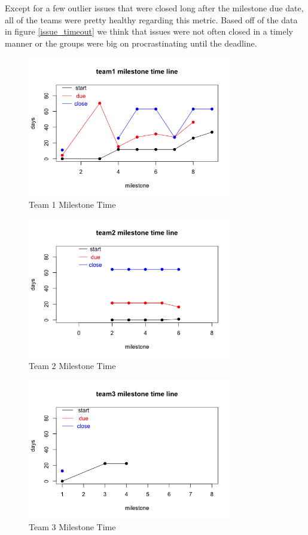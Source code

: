 \documentclass[conference]{IEEEtran}
\begin{document}
Except for a few outlier issues that were closed long after the milestone due date, all of the teams were pretty healthy regarding this metric. Based off of the data in figure \ref{issue_timeout} we think that issues were not often closed in a timely manner or the groups were big on procrastinating until the deadline. 

\begin{figure}[H]
    \centering
    \includegraphics[width=9cm]{../AprilProject/pic/team1_milestone_time.png}
    \caption{Team 1 Milestone Time}
    \label{team1_milestone_time}
\end{figure}

\begin{figure}[H]
    \centering
    \includegraphics[width=9cm]{../AprilProject/pic/team2_milestone_time.png}
    \caption{Team 2 Milestone Time}
    \label{team2_milestone_time}
\end{figure}

\begin{figure}[H]
    \centering
    \includegraphics[width=9cm]{../AprilProject/pic/team3_milestone_time.png}
    \caption{Team 3 Milestone Time}
    \label{team3_milestone_time}
\end{figure}
\end{document}
